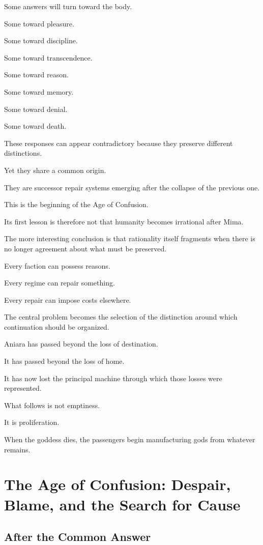 \documentclass[11pt,oneside]{book}
\theoremstyle{definition}
\theoremstyle{remark}
\begin{document}
Some answers will turn toward the body.

Some toward pleasure.

Some toward discipline.

Some toward transcendence.

Some toward reason.

Some toward memory.

Some toward denial.

Some toward death.

These responses can appear contradictory because they preserve different distinctions.

Yet they share a common origin.

They are successor repair systems emerging after the collapse of the previous one.

This is the beginning of the Age of Confusion.

Its first lesson is therefore not that humanity becomes irrational after Mima.

The more interesting conclusion is that rationality itself fragments when there is no longer agreement about what must be preserved.

Every faction can possess reasons.

Every regime can repair something.

Every repair can impose costs elsewhere.

The central problem becomes the selection of the distinction around which continuation should be organized.

Aniara has passed beyond the loss of destination.

It has passed beyond the loss of home.

It has now lost the principal machine through which those losses were represented.

What follows is not emptiness.

It is proliferation.

When the goddess dies, the passengers begin manufacturing gods from whatever remains.

\chapter{The Age of Confusion: Despair, Blame, and the Search for Cause}

\section{After the Common Answer}
\end{document}
